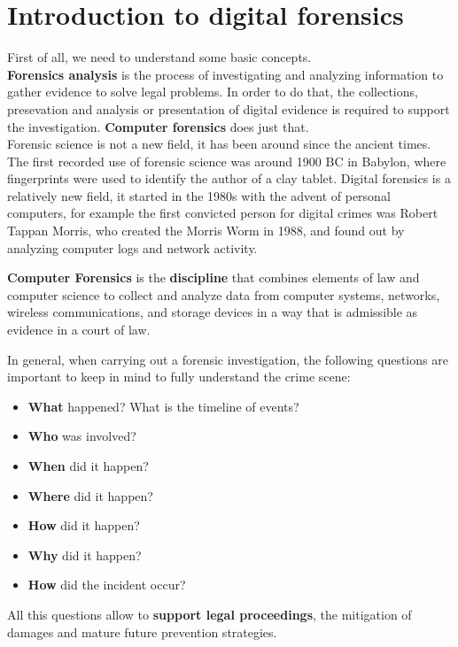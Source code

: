 \chapter{Introduction to digital forensics}
First of all, we need to understand some basic concepts. \\
\textbf{Forensics analysis} is the process of investigating and
analyzing information to gather evidence to solve legal problems. In
order to do that, the collections, presevation and analysis or
presentation of digital evidence is required to support the
investigation. \textbf{Computer forensics} does just that.\\
Forensic science is not a new field, it has been around since the
ancient times. The first recorded use of forensic science was around
1900 BC in Babylon, where fingerprints were used to identify the 
author of a clay tablet. Digital forensics is a relatively new field,
it started in the 1980s with the advent of personal computers, for
example the first convicted person for digital crimes was Robert
Tappan Morris, who created the Morris Worm in 1988, and found out by
analyzing computer logs and network activity.
\begin{boxH}
  \textbf{Computer Forensics} is the \textbf{discipline} that combines elements
  of law and computer science to collect and analyze data from computer
  systems, networks, wireless communications, and storage devices in a way that
  is admissible as evidence in a court of law.
\end{boxH}
In general, when carrying out a forensic investigation, the following
questions are important to keep in mind to fully understand the 
crime scene:
\begin{itemize}
  \item \textbf{What} happened? What is the timeline of events?
  \item \textbf{Who} was involved?
  \item \textbf{When} did it happen?
  \item \textbf{Where} did it happen?
  \item \textbf{How} did it happen?
  \item \textbf{Why} did it happen?
  \item \textbf{How} did the incident occur?
\end{itemize}
All this questions allow to \textbf{support legal proceedings}, the mitigation
of damages and mature future prevention strategies.

